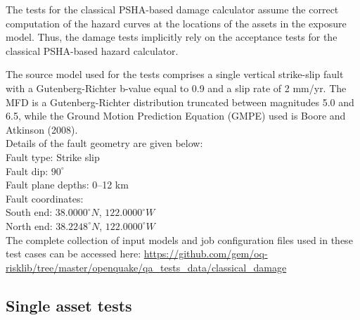 The tests for the classical PSHA-based damage calculator assume the correct computation of the hazard curves at the locations of the assets in the exposure model. Thus, the damage tests implicitly rely on the acceptance tests for the classical PSHA-based hazard calculator.

The source model used for the tests comprises a single vertical strike-slip fault with a Gutenberg-Richter b-value equal to 0.9 and a slip rate of 2 mm/yr. The MFD is a Gutenberg-Richter distribution truncated between magnitudes 5.0 and 6.5, while the Ground Motion Prediction Equation (GMPE) used is Boore and Atkinson (2008).\\

\noindent Details of the fault geometry are given below:\\

\noindent
Fault type: Strike slip\\
Fault dip: $90^{\circ}$\\
Fault plane depths: 0--12 km\\
Fault coordinates:\\
South end: $38.0000^{\circ} N$, $122.0000^{\circ} W$\\
North end: $38.2248^{\circ} N$, $122.0000^{\circ} W$\\

The complete collection of input models and job configuration files used in these test cases can be accessed here:
\href{https://github.com/gem/oq-risklib/tree/master/openquake/qa_tests_data/classical_damage}
{https://github.com/gem/oq-risklib/tree/master/openquake/qa\_tests\_data/classical\_damage}

\subsection{Single asset tests}
\label{subsec:cd-single}


% 

% 